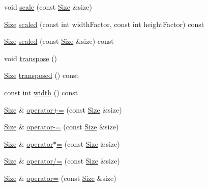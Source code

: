 \begin{DoxyCompactItemize}
\item 
void \hyperlink{classprism_1_1_size_a51e5b4604ec60acb92248969420d6d9e}{scale} (const \hyperlink{classprism_1_1_size}{Size} \&size)
\item 
\hyperlink{classprism_1_1_size}{Size} \hyperlink{classprism_1_1_size_ad15785fa5d1a1bb8f453185e39c1a598}{scaled} (const int width\+Factor, const int height\+Factor) const 
\item 
\hyperlink{classprism_1_1_size}{Size} \hyperlink{classprism_1_1_size_a6f87084cf55571eda2a1213f77b01c0e}{scaled} (const \hyperlink{classprism_1_1_size}{Size} \&size) const 
\item 
void \hyperlink{classprism_1_1_size_ab1e9872f48f2ec894849973d6a325af6}{transpose} ()
\item 
\hyperlink{classprism_1_1_size}{Size} \hyperlink{classprism_1_1_size_aaf2b4a70bfe6f18224c25f64901d8d8a}{transposed} () const 
\item 
const int \hyperlink{classprism_1_1_size_a596f8cbdf0baa999e9652c702d58f0f3}{width} () const 
\item 
\hyperlink{classprism_1_1_size}{Size} \& \hyperlink{classprism_1_1_size_a4b286b00f94ede0b1befc2518e59d029}{operator+=} (const \hyperlink{classprism_1_1_size}{Size} \&size)
\item 
\hyperlink{classprism_1_1_size}{Size} \& \hyperlink{classprism_1_1_size_a4db44f1440ff4f3ed7e7879fa2168437}{operator-\/=} (const \hyperlink{classprism_1_1_size}{Size} \&size)
\item 
\hyperlink{classprism_1_1_size}{Size} \& \hyperlink{classprism_1_1_size_ad5b3210ab613aa1e36e38a2ae645d1a0}{operator$\ast$=} (const \hyperlink{classprism_1_1_size}{Size} \&size)
\item 
\hyperlink{classprism_1_1_size}{Size} \& \hyperlink{classprism_1_1_size_a6e29b50d7211ff0eb21a5354828693cd}{operator/=} (const \hyperlink{classprism_1_1_size}{Size} \&size)
\item 
\hyperlink{classprism_1_1_size}{Size} \& \hyperlink{classprism_1_1_size_a27028bedf4be17c142e2ef60383beadb}{operator=} (const \hyperlink{classprism_1_1_size}{Size} \&size)
\end{DoxyCompactItemize}
